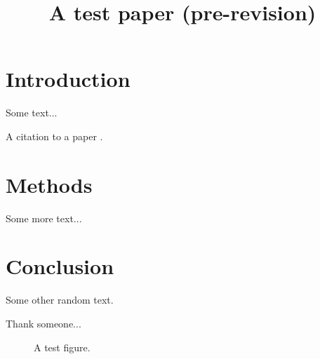 \documentclass{ametsoc}
\title{A test paper (pre-revision)}
\affiliation{Some Affiliation}
\begin{document}
\maketitle

%
%

\section{Introduction}\label{Introduction}

Some text...

A citation to a paper \citep{Gregg2003}.

\section{Methods}

Some more text...

\section{Conclusion}

Some other random text.

%
\acknowledgments

Thank someone...






\begin{figure}
  \caption{A test figure.}
\label{}
\end{figure}
\end{document}
